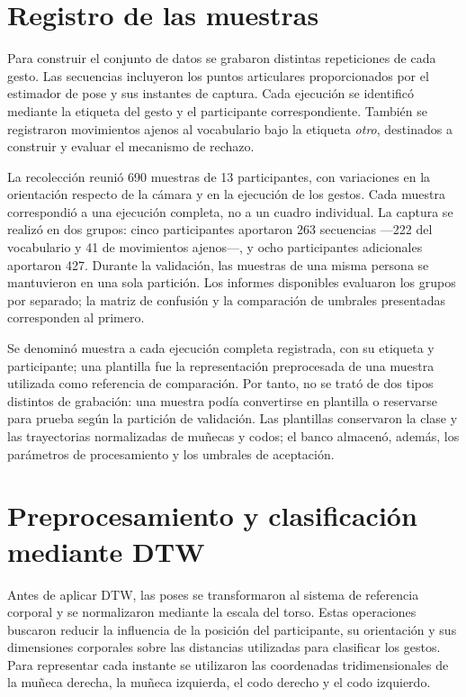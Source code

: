 \section{Registro de las muestras}

Para construir el conjunto de datos se grabaron distintas repeticiones de cada gesto. Las secuencias incluyeron los puntos articulares proporcionados por el estimador de pose y sus instantes de captura. Cada ejecución se identificó mediante la etiqueta del gesto y el participante correspondiente. También se registraron movimientos ajenos al vocabulario bajo la etiqueta \textit{otro}, destinados a construir y evaluar el mecanismo de rechazo.

La recolección reunió 690 muestras de 13 participantes, con variaciones en la orientación respecto de la cámara y en la ejecución de los gestos. Cada muestra correspondió a una ejecución completa, no a un cuadro individual. La captura se realizó en dos grupos: cinco participantes aportaron 263 secuencias —222 del vocabulario y 41 de movimientos ajenos—, y ocho participantes adicionales aportaron 427. Durante la validación, las muestras de una misma persona se mantuvieron en una sola partición. Los informes disponibles evaluaron los grupos por separado; la matriz de confusión y la comparación de umbrales presentadas corresponden al primero.

Se denominó muestra a cada ejecución completa registrada, con su etiqueta y participante; una plantilla fue la representación preprocesada de una muestra utilizada como referencia de comparación. Por tanto, no se trató de dos tipos distintos de grabación: una muestra podía convertirse en plantilla o reservarse para prueba según la partición de validación. Las plantillas conservaron la clase y las trayectorias normalizadas de muñecas y codos; el banco almacenó, además, los parámetros de procesamiento y los umbrales de aceptación.

\section{Preprocesamiento y clasificación mediante DTW}

Antes de aplicar DTW, las poses se transformaron al sistema de referencia corporal y se normalizaron mediante la escala del torso. Estas operaciones buscaron reducir la influencia de la posición del participante, su orientación y sus dimensiones corporales sobre las distancias utilizadas para clasificar los gestos. Para representar cada instante se utilizaron las coordenadas tridimensionales de la muñeca derecha, la muñeca izquierda, el codo derecho y el codo izquierdo.

